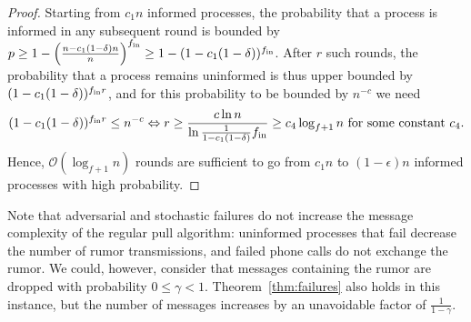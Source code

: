 \begin{proof}
Starting from $c_1 n$ informed processes, the probability that a process is informed in any subsequent round is bounded by $p \geq 1-\left(\frac{n-c_1(1-\delta)n}{n}\right)^{f_\text{in}} \geq 1 - (1-c_1(1-\delta))^{f_\text{in}}$.  After $r$ such rounds, the probability that a process remains uninformed is thus upper bounded by $(1-c_1(1-\delta))^{f_\text{in} r}$, and for this probability to be bounded by $n^{-c}$ we need
  \begin{align}
    (1-c_1(1-\delta))^{f_\text{in} r} \leq n^{-c} \Leftrightarrow
    r \geq  \frac{c \ln n}{\ln{\frac{1}{1-c_1(1-\delta)}}f_\text{in}} \geq c_4 \log_{f+1} n \text{ for some constant $c_4$.}
  \end{align}
Hence, $\mathcal{O}(\log_{f+1} n)$ rounds are sufficient to go from $c_1n$ to $(1-\epsilon) n$ informed processes with high probability.

\end{proof}

Note that adversarial and stochastic failures do not increase the message complexity of the regular pull algorithm: uninformed processes that fail decrease the number of rumor transmissions, and failed phone calls do not exchange the rumor. We could, however, consider that messages containing the rumor are dropped with probability $0 \leq \gamma < 1$. Theorem~\ref{thm:failures} also holds in this instance, but the number of messages increases by an unavoidable factor of $\frac{1}{1-\gamma}$.




